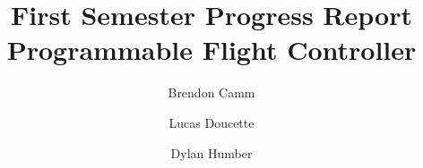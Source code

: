 \documentclass[12pt, twoside, letterpaper,titlepage]{article}
\title{First Semester Progress Report \\ Programmable Flight Controller}
\author{Brendon Camm \and Lucas Doucette \and Dylan Humber}
\begin{document}
\maketitle

\begin{abstract} %
\end{abstract}
\setcounter{tocdepth}{2}
\tableofcontents
\pagebreak










\end{document}
